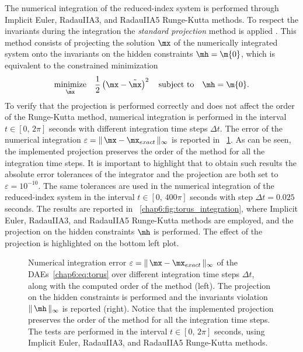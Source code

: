 The numerical integration of the reduced-index system is performed through Implicit Euler, RadauIIA3, and RadauIIA5 Runge-Kutta methods. To respect the invariants during the integration the \emph{standard projection} method is applied \cite{hairer2000symmetric}. This method consists of projecting the solution $\mx$ of the numerically integrated system onto the invariants on the hidden constraints $\mh = \m{0}$, which is equivalent to the constrained minimization
%
\begin{equation}
  \underset{\tilde{\mx}}{\textrm{minimize}} \quad \dfrac{1}{2}\left(\mx - \tilde{\mx}\right)^2
    \quad \textrm{subject to} \quad
    \mh = \m{0}.
\end{equation}
%
To verify that the projection is performed correctly and does not affect the order of the Runge-Kutta method, numerical integration is performed in the interval $t \in [0, \, 2\pi]$ seconds with different integration time steps $\Delta t$. The error of the numerical integration $\varepsilon = \| \, \mx - \mx_{exact} \, \|_{\infty}$ is reported in \figurename~\ref{chap6:fig:torus_order}. As can be seen, the implemented projection preserves the order of the method for all the integration time steps. It is important to highlight that to obtain such results the absolute error tolerances of the integrator and the projection are both set to $\varepsilon = 10^{-10}$. The same tolerances are used in the numerical integration of the reduced-index system in the interval $t \in [0, \, 400\pi]$ seconds with step $\Delta t = 0.025$ seconds. The results are reported in \figurename~\ref{chap6:fig:torus_integration}, where Implicit Euler, RadauIIA3, and RadauIIA5 Runge-Kutta methods are employed, and the projection on the hidden constraints $\mh$ is performed. The effect of the projection is highlighted on the bottom left plot.

\begin{figure}
  \centering
  \caption[
    Numerical integration error of the \acp{DAE}~\eqref{chap6:eq:torus} over different integration time steps, along with the computed order of the method.
  ]{
    Numerical integration error $\varepsilon = \| \, \mx - \mx_{exact} \, \|_{\infty}$ of the \acp{DAE}~\eqref{chap6:eq:torus} over different integration time steps $\Delta t$, along with the computed order of the method (left). The projection on the hidden constraints is performed and the invariants violation $\| \, \mh \, \|_{\infty}$ is reported (right). Notice that the implemented projection preserves the order of the method for all the integration time steps. The tests are performed in the interval $t \in [0, \, 2\pi]$ seconds, using Implicit Euler, RadauIIA3, and RadauIIA5 Runge-Kutta methods.
  }
  \label{chap6:fig:torus_order}
\end{figure}

